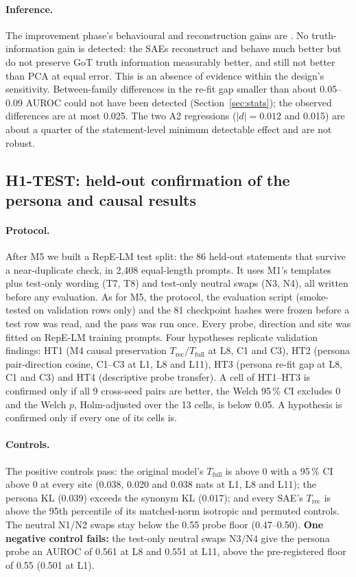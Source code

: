 \paragraph{Inference.} The improvement phase's behavioural and reconstruction gains are . No
truth-information gain is detected: the SAEs reconstruct and behave much better but do not preserve GoT truth
information measurably better, and still not better than PCA at equal error. This is an absence of evidence within the
design's sensitivity. Between-family differences in the re-fit gap smaller than about 0.05--0.09 AUROC could not have
been detected (Section~\ref{sec:stats}); the observed differences are at most 0.025. The two A2 regressions
($|d|=0.012$ and 0.015) are about a quarter of the statement-level minimum detectable effect and are not robust.




\subsection{H1-TEST: held-out confirmation of the persona and causal results}\label{sec:h1test}

\paragraph{Protocol.} After M5 we built a RepE-LM test split: the 86 held-out statements that survive a
near-duplicate check, in 2,408 equal-length prompts. It uses M1's templates plus test-only wording (T7, T8) and test-only
neutral swaps (N3, N4), all written before any evaluation. As for M5, the protocol, the evaluation script (smoke-tested
on validation rows only) and the 81 checkpoint hashes were frozen before a test row was read, and the pass was run
once. Every probe, direction and site was fitted on RepE-LM training prompts. Four hypotheses replicate validation
findings: HT1 (M4 causal preservation $T_{\text{rec}}/T_{\text{full}}$ at L8, C1 and C3), HT2 (persona
pair-direction cosine, C1--C3 at L1, L8 and L11), HT3 (persona re-fit gap at L8, C1 and C3) and HT4 (descriptive
probe transfer). A cell of HT1--HT3 is confirmed only if all 9 cross-seed pairs are better, the Welch 95\,\% CI
excludes 0 and the Welch $p$, Holm-adjusted over the 13 cells, is below 0.05. A hypothesis is confirmed only if
every one of its cells is.

\paragraph{Controls.} The positive controls pass: the original model's $T_{\text{full}}$ is above 0 with a 95\,\%
CI above 0 at every site (0.038, 0.020 and 0.038 nats at L1, L8 and L11); the persona KL (0.039) exceeds the synonym
KL (0.017); and every SAE's $T_{\text{rec}}$ is above the 95th percentile of its matched-norm isotropic and permuted
controls. The neutral N1/N2 swaps stay below the 0.55 probe floor (0.47--0.50). \textbf{One negative control fails:}
the test-only neutral swaps N3/N4 give the persona probe an AUROC of 0.561 at L8 and 0.551 at L11, above the
pre-registered floor of 0.55 (0.501 at L1).

